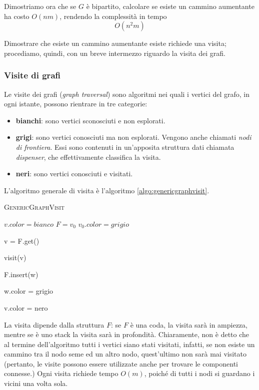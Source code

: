 Dimostriamo ora che se $G$ è bipartito, calcolare se esiste un cammino
aumentante ha costo $O(nm)$, rendendo la complessità in tempo
$$
	O(n^2m)
$$

Dimostrare che esiste un cammino aumentante esiste richiede una visita;
procediamo, quindi, con un breve intermezzo riguardo la visita dei grafi.

\subsubsection{Visite di grafi}
Le visite dei grafi (\textit{graph traversal}) sono algoritmi nei quali i vertici
del grafo, in ogni istante, possono rientrare in tre categorie:
\begin{itemize}
	\item{\bf bianchi}: sono vertici sconosciuti e non esplorati.
	\item{\bf grigi}: sono vertici conosciuti ma non esplorati. Vengono anche
	chiamati \textit{nodi di frontiera}. Essi sono contenuti in un'apposita
	struttura dati chiamata \textit{dispenser}, che effettivamente classifica
	la visita.
	\item{\bf neri}: sono vertici conosciuti e visitati.
\end{itemize}

L'algoritmo generale di visita è l'algoritmo \ref{algo:genericgraphvisit}.

\begin{algorithm}[h]
	\caption{\textsc{GenericGraphVisit}}
	\label{algo:genericgraphvisit}
	{
		$v.color = bianco$
	}
	$ F = v_0$ 
	$ v_0.color = grigio$

	{
		v = F.get()

		visit(v)

		{

			{

				F.insert(w)

				w.color = grigio

			}
		}
		v.color = nero
	}
\end{algorithm}

La visita dipende dalla struttura $F$: se $F$ è una coda, la visita sarà in
ampiezza, mentre se è uno stack la visita sarà in profondità. Chiaramente,
non è detto che al termine dell'algoritmo tutti i vertici siano stati visitati,
infatti, se non esiste un cammino tra il nodo seme ed un altro nodo,
quest'ultimo non sarà mai visitato (pertanto, le visite possono essere utilizzate
anche per trovare le componenti connesse.)
Ogni visita richiede tempo $O(m)$,  poiché di tutti i nodi si guardano i vicini una volta sola.

